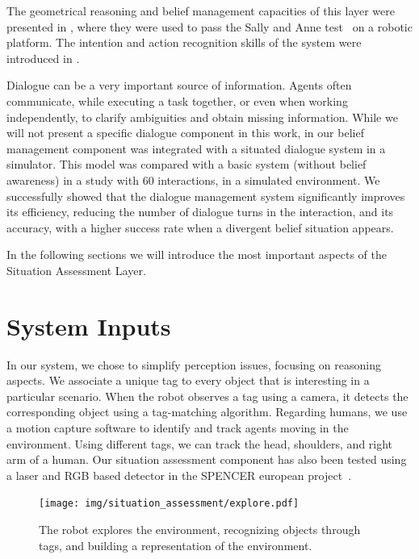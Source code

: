 The geometrical reasoning and belief management capacities of this layer were presented in \cite{Milliez2014}, where they were used to pass the Sally and Anne test~\cite{Baron1985} on a robotic platform. The intention and action recognition skills of the system were introduced in \cite{devin2016some}.

Dialogue can be a very important source of information. Agents often communicate, while executing a task together, or even when working independently, to clarify ambiguities and obtain missing information. While we will not present a specific dialogue component in this work,  in \cite{Ferreira2015} our belief management component was integrated with a situated dialogue system in a simulator. This model was compared with a basic system (without belief awareness) in a study with 60 interactions, in a simulated environment. We successfully showed that the dialogue management system significantly improves its efficiency, reducing the number of dialogue turns in the interaction, and its accuracy, with a higher success rate when a divergent belief situation appears.

In the following sections we will introduce the most important aspects of the Situation Assessment Layer.

\section{System Inputs}
\label{sec:situation_assessment-system_inputs}
In our system, we chose to simplify perception issues, focusing on reasoning aspects. We associate a unique tag to every object that is interesting in a particular scenario.  When the robot observes a tag using a camera, it detects the corresponding object using a tag-matching algorithm.
Regarding humans, we use a motion capture software to identify and track agents moving in the environment. Using different tags, we can track the head, shoulders, and right arm of a human. Our situation assessment component has also been tested using a laser and RGB based detector in the SPENCER european project~\cite{lindermulti}.

 \begin{figure}[ht!]
	\centering
	\texttt{[image: img/situation\_assessment/explore.pdf]}
	\caption[The robot builds a representation of the environment]{The robot explores the environment, recognizing objects through tags, and building a representation of the environment.}
	\label{fig:situation_assessment-explore}
\end{figure}


